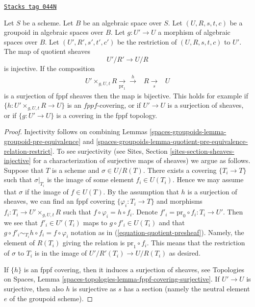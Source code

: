 \begin{lemma}
\label{spaces-groupoids-lemma-quotient-groupoid-restrict}
\href{https://stacks.math.columbia.edu/tag/044N}{\texttt{Stacks tag 044N}}

Let $S$ be a scheme. Let $B$ be an algebraic space over $S$.
Let $(U, R, s, t, c)$ be a groupoid in algebraic spaces over $B$.
Let $g : U' \to U$ a morphism of algebraic spaces over $B$.
Let $(U', R', s', t', c')$ be the restriction of $(U, R, s, t, c)$ to $U'$.
The map of quotient sheaves
$$
U'/R' \longrightarrow U/R
$$
is injective. If the composition
$$
\begin{array}{ccc}U' \times_{g, U, t} R \underset{\text{pr}_1}{\longrightarrow}\overset{h}{\longrightarrow} & R \underset{s}{\longrightarrow} & U\end{array}
$$
is a surjection of fppf sheaves then the map is bijective.
This holds for example if $\{h : U' \times_{g, U, t} R \to U\}$ is an
$fppf$-covering, or if $U' \to U$ is a surjection of sheaves, or if
$\{g : U' \to U\}$ is a covering in the fppf topology.
\end{lemma}

\begin{proof}
Injectivity follows on combining
Lemmas \ref{spaces-groupoids-lemma-groupoid-pre-equivalence} and
\ref{spaces-groupoids-lemma-quotient-pre-equivalence-relation-restrict}.
To see surjectivity (see
Sites, Section \ref{sites-section-sheaves-injective}
for a characterization of surjective maps of sheaves) we argue as follows.
Suppose that $T$ is a scheme and $\sigma \in U/R(T)$.
There exists a covering $\{T_i \to T\}$ such that $\sigma|_{T_i}$
is the image of some element $f_i \in U(T_i)$. Hence we
may assume that $\sigma$ if the image of $f \in U(T)$.
By the assumption that $h$ is a surjection of sheaves, we
can find an fppf covering $\{\varphi_i : T_i \to T\}$ and morphisms
$f_i : T_i \to U' \times_{g, U, t} R$ such that
$f \circ \varphi_i = h \circ f_i$. Denote
$f'_i = \text{pr}_0 \circ f_i : T_i \to U'$. Then we see that
$f'_i \in U'(T_i)$ maps to $g \circ f'_i \in U(T_i)$ and
that $g \circ f'_i \sim_{T_i} h \circ f_i = f \circ \varphi_i$
notation as in (\ref{equation-quotient-presheaf}). Namely, the
element of $R(T_i)$ giving the relation is $\text{pr}_1 \circ f_i$.
This means that the restriction
of $\sigma$ to $T_i$ is in the image of $U'/R'(T_i) \to U/R(T_i)$
as desired.

\medskip\noindent
If $\{h\}$ is an fppf covering, then it induces a surjection of sheaves, see
Topologies on Spaces,
Lemma \ref{spaces-topologies-lemma-fppf-covering-surjective}.
If $U' \to U$ is surjective, then also $h$ is surjective as $s$ has a section
(namely the neutral element $e$ of the groupoid scheme).
\end{proof}

